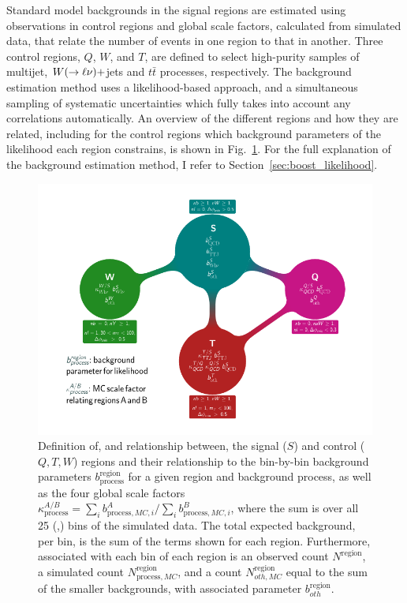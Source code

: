 Standard model backgrounds in the signal regions are estimated using observations in control regions
and global scale factors, calculated from simulated data, that relate the number of events in one
region to that in another. 
Three control regions, $Q$, $W$, and $T$, are defined to select high-purity samples of multijet,
$W(\rightarrow \ell\nu)+$jets and $t\bar{t}$ processes, respectively.  
The background estimation method uses a likelihood-based approach, and a simultaneous sampling
of systematic uncertainties which fully takes into account any correlations automatically.
An overview of the different regions and how they are related, including for the control regions
which background parameters of the likelihood each region constrains, is shown in
Fig.~\ref{fig:boost_flowchart}. For the full explanation of the background estimation method, I
refer to Section~\ref{sec:boost_likelihood}. 

\begin{figure}[p]
  \centering
  \includegraphics[width=\textwidth]{figures/razor_strategy/BoostFlowChart_noZ}
  \caption{Definition of, and relationship between, the signal ($S$) and control ($Q,T,W$) regions
and their relationship to the bin-by-bin background parameters
$b^{\textrm{region}}_{\textrm{process}}$ for a given region and background process, as well as the
four global scale factors $\kappa^{A/B}_{\textrm{process}} = \sum_i b^A_{\textrm{process}, MC, i} /
\sum_i b^B_{\textrm{process}, MC, i}$, where the sum is over all 25 (\mr,\rsq) bins of the simulated
data. 
The total expected background, per bin, is the sum of the terms shown for each region. Furthermore,
associated with each bin of each region is an observed count $N^{\textrm{region}}$, a simulated
count $N^{\textrm{region}}_{\textrm{process}, MC}$, and a count $N^{\textrm{region}}_{oth, MC}$
equal to the sum of the smaller backgrounds, with associated parameter $b^{\textrm{region}}_{oth}$.
  \label{fig:boost_flowchart}}
\end{figure}
